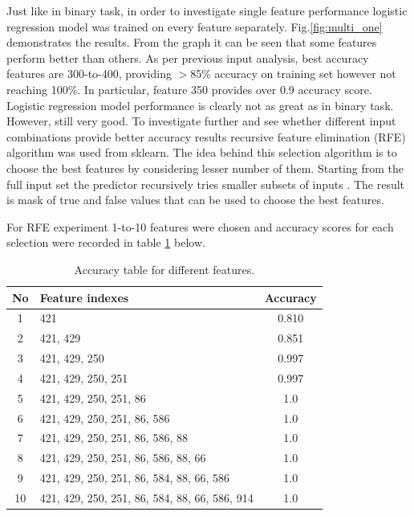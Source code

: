 \documentclass[11pt]{article}
\begin{document}
			Just like in binary task, in order to investigate single feature performance logistic regression model was trained on every feature separately. Fig.\ref{fig:multi_one} demonstrates the results. From the graph it can be seen that some features perform better than others. As per previous input analysis, best accuracy features are 300-to-400, providing $>$85\% accuracy on training set however not reaching 100\%. In particular, feature 350 provides over 0.9 accuracy score. Logistic regression model performance is clearly not as great as in binary task. However, still very good. To investigate further and see whether different input combinations provide better accuracy results recursive feature elimination (RFE) algorithm was used from sklearn. The idea behind this selection algorithm is to choose the best features by considering lesser number of them. Starting from the full input set the predictor recursively tries smaller subsets of inputs \cite{rfe}. The result is mask of true and false values that can be used to choose the best features. 

			For RFE experiment 1-to-10 features were chosen and accuracy scores for each selection were recorded in table \ref{tbl:accuracy_table} below.

		\begin{center}
		  	\begin{table}[h]
		  	\centering
			\begin{tabular}[b]{|c | l | c|}
				 \hline
				 No & Feature indexes 	  						    & Accuracy \\ 
				 \hline
				 1 & 421 											& 0.810 \\ 
				 2 & 421, 429 										& 0.851 \\ 
				 3 & 421, 429, 250 									& 0.997 \\ 
				 4 & 421, 429, 250, 251 							& 0.997 \\ 
				 5 & 421, 429, 250, 251, 86 						& 1.0 	\\ 
				 6 & 421, 429, 250, 251, 86, 586 					& 1.0 	\\ 
				 7 & 421, 429, 250, 251, 86, 586, 88 				& 1.0 	\\ 
				 8 & 421, 429, 250, 251, 86, 586, 88, 66 			& 1.0 	\\ 
				 9 & 421, 429, 250, 251, 86, 584, 88, 66, 586 		& 1.0 	\\ 
				 10 & 421, 429, 250, 251, 86, 584, 88, 66, 586, 914 & 1.0 	\\ 
				 \hline
			\end{tabular}
			\caption{Accuracy table for different features. }
			\label{tbl:accuracy_table}
			\end{table}
		\end{center}
		\vspace*{-1.3cm}
\end{document}
